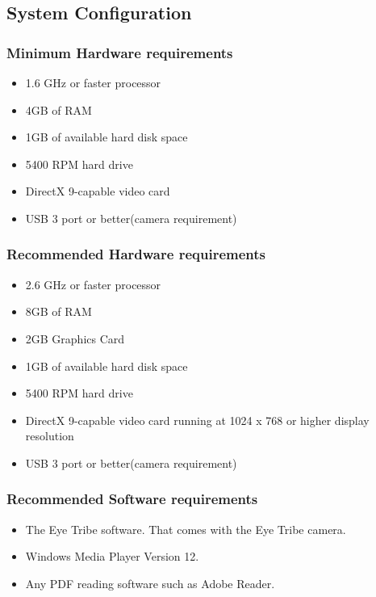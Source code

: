 \subsection{System Configuration}
\subsubsection{Minimum Hardware requirements}
\begin{itemize}
\item 1.6 GHz or faster processor
\item 4GB of RAM
\item 1GB of available hard disk space
\item 5400 RPM hard drive
\item DirectX 9-capable video card
\item USB 3 port or better(camera requirement)
\end{itemize}

\subsubsection{Recommended Hardware requirements}
\begin{itemize}
\item 2.6 GHz or faster processor
\item 8GB of RAM
\item 2GB Graphics Card
\item 1GB of available hard disk space
\item 5400 RPM hard drive
\item DirectX 9-capable video card running at 1024 x 768 or higher display resolution
\item USB 3 port or better(camera requirement)
\end{itemize}

\subsubsection{Recommended Software requirements}
\begin{itemize}
\item The Eye Tribe software. That comes with the Eye Tribe camera.
\item Windows Media Player Version 12.
\item Any PDF reading software such as Adobe Reader.
\end{itemize}

